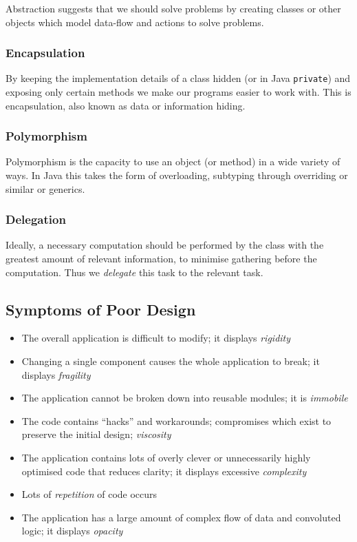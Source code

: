 \documentclass[12pt]{report}
\newcommand{\code}[1]{\lstinline{#1}}
\begin{document}
\begin{flushleft}
Abstraction suggests that we should solve problems by creating classes or other
objects which model data-flow and actions to solve problems.

\subsubsection*{Encapsulation}

By keeping the implementation details of a class hidden (or in Java
\code{private}) and exposing only certain methods we make our programs easier
to work with. This is encapsulation, also known as data or information hiding.

\subsubsection*{Polymorphism}

Polymorphism is the capacity to use an object (or method) in a wide variety of
ways. In Java this takes the form of overloading, subtyping through overriding
or similar or generics.

\subsubsection*{Delegation}

Ideally, a necessary computation should be performed by the class with the
greatest amount of relevant information, to minimise gathering before the
computation. Thus we \textit{delegate} this task to the relevant task.

\subsection*{Symptoms of Poor Design}

\begin{itemize}
    \item The overall application is difficult to modify; it displays
        \textit{rigidity}
    \item Changing a single component causes the whole application to break;
        it displays \textit{fragility}
    \item The application cannot be broken down into reusable modules; it is
        \textit{immobile}
    \item The code contains ``hacks'' and workarounds; compromises which exist
        to preserve the initial design; \textit{viscosity}
    \item The application contains lots of overly clever or unnecessarily
        highly optimised code that reduces clarity; it displays excessive
        \textit{complexity}
    \item Lots of \textit{repetition} of code occurs
    \item The application has a large amount of complex flow of data and
        convoluted logic; it displays \textit{opacity}
\end{itemize}


\end{flushleft}
\end{document}
